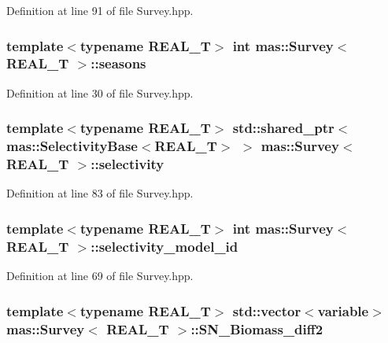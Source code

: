Definition at line 91 of file Survey.\-hpp.

\hypertarget{structmas_1_1_survey_a823552ecb1c304d152b0befca7465394}{
\subsubsection[{seasons}]{\setlength{\rightskip}{0pt plus 5cm}template$<$typename R\-E\-A\-L\-\_\-\-T$>$ int {\bf mas\-::\-Survey}$<$ R\-E\-A\-L\-\_\-\-T $>$\-::seasons}}\label{structmas_1_1_survey_a823552ecb1c304d152b0befca7465394}


Definition at line 30 of file Survey.\-hpp.

\hypertarget{structmas_1_1_survey_a798139029887e8727481a8f76b261ee0}{
\subsubsection[{selectivity}]{\setlength{\rightskip}{0pt plus 5cm}template$<$typename R\-E\-A\-L\-\_\-\-T$>$ std\-::shared\-\_\-ptr$<${\bf mas\-::\-Selectivity\-Base}$<$R\-E\-A\-L\-\_\-\-T$>$ $>$ {\bf mas\-::\-Survey}$<$ R\-E\-A\-L\-\_\-\-T $>$\-::selectivity}}\label{structmas_1_1_survey_a798139029887e8727481a8f76b261ee0}


Definition at line 83 of file Survey.\-hpp.

\hypertarget{structmas_1_1_survey_ab8a937f0a4f30704ad3d096389df45ae}{
\subsubsection[{selectivity\-\_\-model\-\_\-id}]{\setlength{\rightskip}{0pt plus 5cm}template$<$typename R\-E\-A\-L\-\_\-\-T$>$ int {\bf mas\-::\-Survey}$<$ R\-E\-A\-L\-\_\-\-T $>$\-::selectivity\-\_\-model\-\_\-id}}\label{structmas_1_1_survey_ab8a937f0a4f30704ad3d096389df45ae}


Definition at line 69 of file Survey.\-hpp.

\hypertarget{structmas_1_1_survey_a3394b3a1fbc6ac6c788cde5411b6e9e3}{
\subsubsection[{S\-N\-\_\-\-Biomass\-\_\-diff2}]{\setlength{\rightskip}{0pt plus 5cm}template$<$typename R\-E\-A\-L\-\_\-\-T$>$ std\-::vector$<${\bf variable}$>$ {\bf mas\-::\-Survey}$<$ R\-E\-A\-L\-\_\-\-T $>$\-::S\-N\-\_\-\-Biomass\-\_\-diff2}}\label{structmas_1_1_survey_a3394b3a1fbc6ac6c788cde5411b6e9e3}


